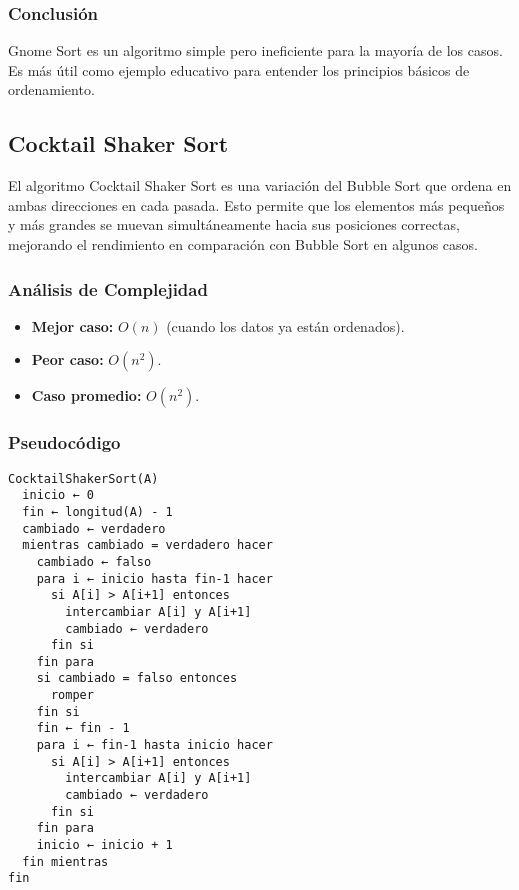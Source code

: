 \documentclass[11pt,openany]{book}
\begin{document}
\subsubsection{Conclusión}
Gnome Sort es un algoritmo simple pero ineficiente para la mayoría de los casos. Es más útil como ejemplo educativo para entender los principios básicos de ordenamiento.



\subsection{Cocktail Shaker Sort}

El algoritmo Cocktail Shaker Sort es una variación del Bubble Sort que ordena en ambas direcciones en cada pasada. Esto permite que los elementos más pequeños y más grandes se muevan simultáneamente hacia sus posiciones correctas, mejorando el rendimiento en comparación con Bubble Sort en algunos casos.

\subsubsection{Análisis de Complejidad}
\begin{itemize}
    \item \textbf{Mejor caso:} $O(n)$ (cuando los datos ya están ordenados).
    \item \textbf{Peor caso:} $O(n^2)$.
    \item \textbf{Caso promedio:} $O(n^2)$.
\end{itemize}

\subsubsection{Pseudocódigo}
\begin{verbatim}
CocktailShakerSort(A)
  inicio ← 0
  fin ← longitud(A) - 1
  cambiado ← verdadero
  mientras cambiado = verdadero hacer
    cambiado ← falso
    para i ← inicio hasta fin-1 hacer
      si A[i] > A[i+1] entonces
        intercambiar A[i] y A[i+1]
        cambiado ← verdadero
      fin si
    fin para
    si cambiado = falso entonces
      romper
    fin si
    fin ← fin - 1
    para i ← fin-1 hasta inicio hacer
      si A[i] > A[i+1] entonces
        intercambiar A[i] y A[i+1]
        cambiado ← verdadero
      fin si
    fin para
    inicio ← inicio + 1
  fin mientras
fin
\end{verbatim}
\end{document}
